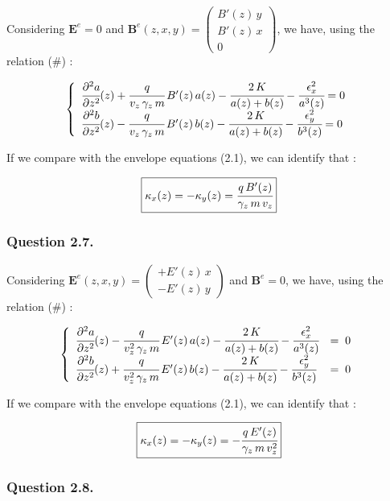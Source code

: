 \documentclass[10pt]{article}
\newcommand{\D}{{\partial}}
\begin{document}
Considering $\mathbf{E}^{e} = 0$ and 
$\mathbf{B}^{e}(z,x,y) = \left(
\begin{array}{c}
B'(z)\,y \\ B'(z)\,x \\ 0
\end{array}
\right)$, we have, using the relation (\#) :

$$
\left\lbrace
    \begin{array}{l}
\cfrac{\D^2 a}{\D z^2}(z) + \cfrac{q}{v_{z}\,\gamma_{z}\,m}\,B'(z)\,a(z) - \cfrac{2\,K}{a(z)+b(z)}  - \cfrac{\epsilon_{x}^2}{a^3(z)} = 0 \\
\cfrac{\D^2 b}{\D z^2}(z) - \cfrac{q}{v_{z}\,\gamma_{z}\,m}\,B'(z)\,b(z) - \cfrac{2\,K}{a(z)+b(z)}  - \cfrac{\epsilon_{y}^2}{b^3(z)} = 0
    \end{array}
\right.
$$

If we compare with the envelope equations (2.1), we can identify that :

$$\boxed{\kappa_{x}(z) = -\kappa_{y}(z) = \cfrac{q\,B'(z)}{\gamma_{z}\,m\,v_z}}$$



\subsubsection{Question 2.7.}


Considering 
$\mathbf{E}^{e}(z,x,y) = \left(
\begin{array}{c}
+E'(z)\,x \\ -E'(z)\,y
\end{array}
\right)$ and $\mathbf{B}^{e} = 0$, we have, using the relation (\#) :


$$
\left\lbrace
    \begin{array}{ll}
\cfrac{\D^2 a}{\D z^2}(z) - \cfrac{q}{v_{z}^2\,\gamma_{z}\,m}\,E'(z)\,a(z) - \cfrac{2\,K}{a(z)+b(z)} - \cfrac{\epsilon_{x}^2}{a^3(z)} &= \; 0 \\
\cfrac{\D^2 b}{\D z^2}(z) + \cfrac{q}{v_{z}^2\,\gamma_{z}\,m}\,E'(z)\,b(z) - \cfrac{2\,K}{a(z)+b(z)} - \cfrac{\epsilon_{y}^2}{b^3(z)} &= \; 0
    \end{array}
\right.
$$

If we compare with the envelope equations (2.1), we can identify that :

$$\boxed{\kappa_{x}(z) = -\kappa_{y}(z) = -\cfrac{q\,E'(z)}{\gamma_{z}\,m\,v_z^2}}$$


\subsubsection{Question 2.8.}
\end{document}
